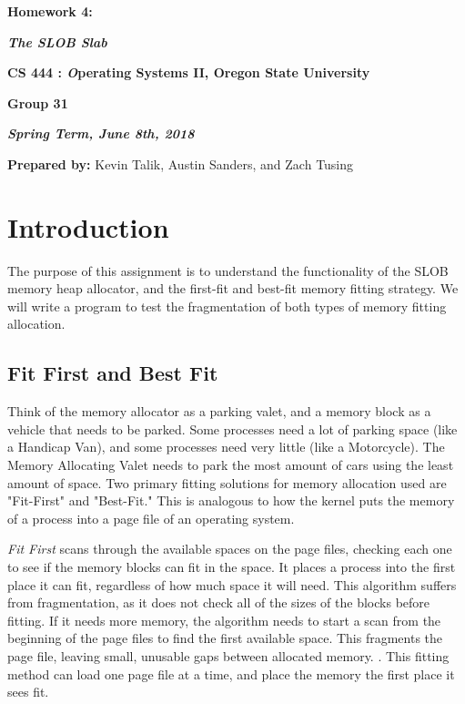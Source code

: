 \documentclass[onecolumn, draftclsnofoot,10pt, compsoc]{IEEEtran}
\def \GroupMemberOne{           Kevin Talik}
\def \GroupMemberTwo{           Austin Sanders}
\def \GroupMemberThree{         Zach Tusing}
\begin{document}
    \begin{center}
    \huge\bf{ Homework 4:} 
   
    \large\textbf{\textit{ The SLOB Slab }}\par
     
    
    
    \small{\bf CS 444 : \textit Operating Systems II, Oregon State University}\par
    \small{\bf{Group 31}}
    
    
    {\bf\textit{ Spring Term, June 8th, 2018} }
    
    
    {\small {\bf Prepared by:} \GroupMemberOne, \GroupMemberTwo, and \GroupMemberThree }
        \end{center}
        \vfill

       \pagebreak
       \section{Introduction}
        The purpose of this assignment is to understand the functionality of the SLOB memory heap allocator, and the first-fit and best-fit memory fitting strategy. We will write a program to test the fragmentation of both types of memory fitting allocation.
        \subsection{Fit First and Best Fit}
        Think of the memory allocator as a parking valet, and a memory block as a vehicle that needs to be parked.
        Some processes need a lot of parking space (like a Handicap Van), and some processes need very little (like a Motorcycle). 
        The Memory Allocating Valet needs to park the most amount of cars using the least amount of space.
        Two primary fitting solutions for memory allocation used are "Fit-First" and "Best-Fit."
        This is analogous to how the kernel puts the memory of a process into a page file of an operating system.

        
        
        
        \textit{Fit First} scans through the available spaces on the page files, checking each one to see if the memory blocks can fit in the space. It places a process into the first place it can fit, regardless of how much space it will need. This algorithm suffers from fragmentation, as it does not check all of the sizes of the blocks before fitting. If it needs more memory, the algorithm needs to start a scan from the beginning of the page files to find the first available space. This fragments the page file, leaving small, unusable gaps between allocated memory. \cite{whatIsFitFirst}. This fitting method can load one page file at a time, and place the memory the first place it sees fit.
        
\end{document}
